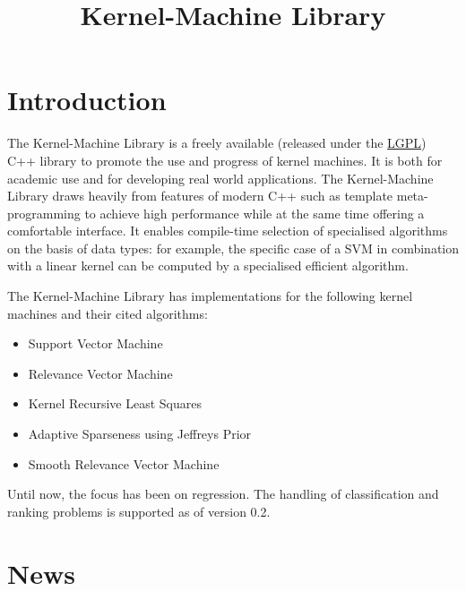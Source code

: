 \documentclass{article}
\begin{document}
\title{Kernel-Machine Library}
\maketitle



\section*{Introduction}

The Kernel-Machine Library is a freely available (released under the 
\href{http://www.gnu.org/copyleft/lesser.html}{LGPL}) C++ library to
promote the use and progress of kernel machines. 
It is both for academic use and for developing real world applications. 
The Kernel-Machine Library draws heavily from features of modern C++ such 
as template meta-programming to achieve high 
performance while at the same time offering a comfortable interface. 
It enables compile-time selection of specialised algorithms on the basis of data types: for example, 
the specific case of a SVM in combination with a linear kernel can be computed by a 
specialised efficient algorithm. 

The Kernel-Machine Library has implementations for the following kernel machines and their cited
algorithms:
%
\begin{itemize}
\item Support Vector Machine \citep{platt99fast,ma03accurate,engel02sparse}
\item Relevance Vector Machine \citep{tipping03fast}
\item Kernel Recursive Least Squares \citep{engel03kernel}
\item Adaptive Sparseness using Jeffreys Prior \citep{figueiredo03adaptive}
\item Smooth Relevance Vector Machine \citep{terborg05smooth}
\end{itemize}
%
Until now, the focus has been on regression. The handling of classification and ranking problems 
is supported as of version 0.2.


\section*{News}
\end{document}
